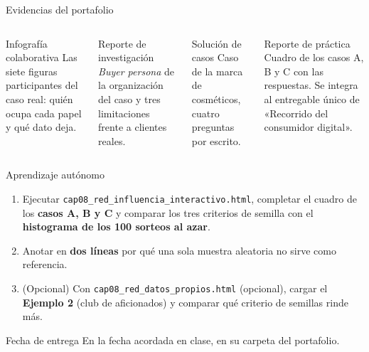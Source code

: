 \documentclass[aspectratio=169,xcolor=dvipsnames]{beamer}
\begin{document}
\begin{frame}{Evidencias del portafolio}
\small
\begin{columns}[T]
  \begin{block}{Infografía colaborativa}
    \scriptsize Las siete figuras participantes del caso real: quién ocupa cada papel y qué dato deja.
  \end{block}
  \begin{block}{Reporte de investigación}
    \scriptsize \textit{Buyer persona} de la organización del caso y tres limitaciones frente a clientes reales.
  \end{block}
  \begin{block}{Solución de casos}
    \scriptsize Caso de la marca de cosméticos, cuatro preguntas por escrito.
  \end{block}
  \begin{block}{Reporte de práctica}
    \scriptsize Cuadro de los casos A, B y C con las respuestas. Se integra al entregable único de «Recorrido del consumidor digital».
  \end{block}
\end{columns}
\end{frame}

\begin{frame}{Aprendizaje autónomo}
\footnotesize
\begin{enumerate}
  \item Ejecutar \texttt{cap08\_red\_influencia\_\allowbreak interactivo.html}, completar el cuadro de los \textbf{casos A, B y C} y comparar los tres criterios de semilla con el \textbf{histograma de los 100 sorteos al azar}.
  \vspace{1pt}
  \item Anotar en \textbf{dos líneas} por qué una sola muestra aleatoria no sirve como referencia.
  \vspace{1pt}
  \item (Opcional) Con \texttt{cap08\_red\_datos\_propios.html} (opcional), cargar el \textbf{Ejemplo 2} (club de aficionados) y comparar qué criterio de semillas rinde más.
\end{enumerate}
\vspace{2pt}
\begin{alertblock}{Fecha de entrega}
  En la fecha acordada en clase, en su carpeta del portafolio.
\end{alertblock}
\end{frame}
\end{document}
